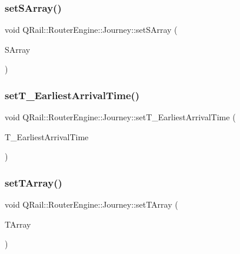 \mbox{\label{classQRail_1_1RouterEngine_1_1Journey_a2f7b14171b6f2fbfcb3f5b5225e8f630}} 
\subsubsection{\texorpdfstring{setSArray()}{setSArray()}}
{\footnotesize\ttfamily void Q\+Rail\+::\+Router\+Engine\+::\+Journey\+::set\+S\+Array (\begin{DoxyParamCaption}\item[{const Q\+Map$<$ Q\+Url, Q\+List$<$ \mbox{\hyperlink{classQRail_1_1RouterEngine_1_1StationStopProfile}{Q\+Rail\+::\+Router\+Engine\+::\+Station\+Stop\+Profile}} $\ast$ $>$ $>$ \&}]{S\+Array }\end{DoxyParamCaption})}

\mbox{\label{classQRail_1_1RouterEngine_1_1Journey_af477bba913bb4326528a2f9dcd2b2e82}} 
\subsubsection{\texorpdfstring{setT\_EarliestArrivalTime()}{setT\_EarliestArrivalTime()}}
{\footnotesize\ttfamily void Q\+Rail\+::\+Router\+Engine\+::\+Journey\+::set\+T\+\_\+\+Earliest\+Arrival\+Time (\begin{DoxyParamCaption}\item[{const Q\+Map$<$ Q\+Url, qint16 $>$ \&}]{T\+\_\+\+Earliest\+Arrival\+Time }\end{DoxyParamCaption})}

\mbox{\label{classQRail_1_1RouterEngine_1_1Journey_acbdb23fc240d5344a20a753bcbb332d5}} 
\subsubsection{\texorpdfstring{setTArray()}{setTArray()}}
{\footnotesize\ttfamily void Q\+Rail\+::\+Router\+Engine\+::\+Journey\+::set\+T\+Array (\begin{DoxyParamCaption}\item[{const Q\+Map$<$ Q\+Url, \mbox{\hyperlink{classQRail_1_1RouterEngine_1_1TrainProfile}{Q\+Rail\+::\+Router\+Engine\+::\+Train\+Profile}} $\ast$ $>$ \&}]{T\+Array }\end{DoxyParamCaption})}

